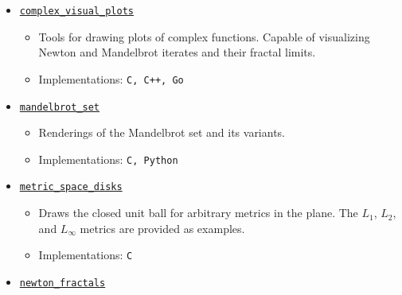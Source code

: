 \documentclass[letterpaper,sans]{moderncv}
\begin{document}
\begin{itemize}
\begin{itemize}
                        Code for rendering the Barnsley fern and variants.
                    \item
                        Implementations: \texttt{C, C++, Python, Go}
                \end{itemize}
            \item
                \href{%
                    https://github.com/ryanmaguire/complex_visual_plots/%
                }{\texttt{complex\_visual\_plots}}
                \begin{itemize}
                    \item
                        Tools for drawing plots of complex functions. Capable
                        of visualizing Newton and Mandelbrot iterates and their
                        fractal limits.
                    \item
                        Implementations: \texttt{C, C++, Go}
                \end{itemize}
            \item
                \href{%
                    https://github.com/ryanmaguire/mandelbrot_set/%
                }{\texttt{mandelbrot\_set}}
                \begin{itemize}
                    \item
                        Renderings of the Mandelbrot set and its variants.
                    \item
                        Implementations: \texttt{C, Python}
                \end{itemize}
            \item
                \href{%
                    https://github.com/ryanmaguire/metric_space_disks/%
                }{\texttt{metric\_space\_disks}}
                \begin{itemize}
                    \item
                        Draws the closed unit ball for arbitrary metrics in the
                        plane. The $L_{1}$, $L_{2}$, and $L_{\infty}$ metrics
                        are provided as examples.
                    \item
                        Implementations: \texttt{C}
                \end{itemize}
            \item
                \href{%
                    https://github.com/ryanmaguire/newton_fractals/%
                }{\texttt{newton\_fractals}}
                \begin{itemize}

\end{itemize}
\end{itemize}
\end{document}
